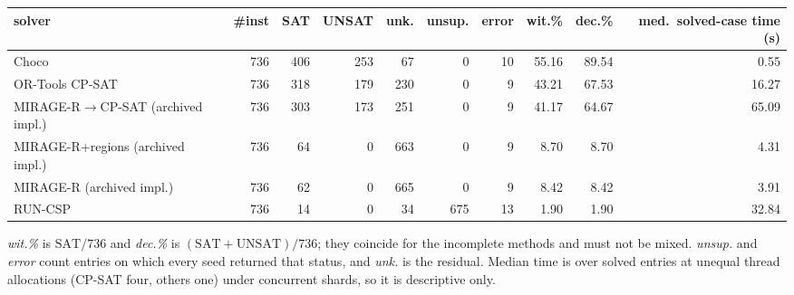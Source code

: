 \begin{table}[htbp]
{\small\begin{tabular}{lrrrrrrrrr}
\toprule
solver & \#inst & SAT & UNSAT & unk. & unsup. & error & wit.\% & dec.\% & med.\ solved-case time (s) \\
\midrule
Choco & 736 & 406 & 253 & 67 & 0 & 10 & 55.16 & 89.54 & 0.55 \\
OR-Tools CP-SAT & 736 & 318 & 179 & 230 & 0 & 9 & 43.21 & 67.53 & 16.27 \\
MIRAGE-R$\to$CP-SAT (archived impl.) & 736 & 303 & 173 & 251 & 0 & 9 & 41.17 & 64.67 & 65.09 \\
MIRAGE-R+regions (archived impl.) & 736 & 64 & 0 & 663 & 0 & 9 & 8.70 & 8.70 & 4.31 \\
MIRAGE-R (archived impl.) & 736 & 62 & 0 & 665 & 0 & 9 & 8.42 & 8.42 & 3.91 \\
RUN-CSP & 736 & 14 & 0 & 34 & 675 & 13 & 1.90 & 1.90 & 32.84 \\
\bottomrule
\end{tabular}}
{\emph{wit.\%} is $\text{SAT}/736$ and \emph{dec.\%} is $(\text{SAT}+\text{UNSAT})/736$; they coincide for the incomplete methods and must not be mixed. \emph{unsup.} and \emph{error} count entries on which every seed returned that status, and \emph{unk.} is the residual. Median time is over solved entries at unequal thread allocations (CP-SAT four, others one) under concurrent shards, so it is descriptive only.}
\end{table}
